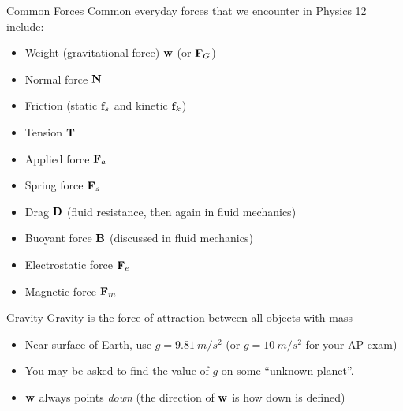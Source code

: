 \documentclass[12pt,compress,aspectratio=169]{beamer}
\newcommand{\mb}[1]{\ensuremath\mathbf{#1}}
\newcommand{\eq}[2]{\vspace{#1}{\Large\begin{displaymath}#2\end{displaymath}}}
\begin{document}
\begin{frame}{Common Forces}
  Common everyday forces that we encounter in Physics 12 include:
  \begin{itemize}
  \item Weight (gravitational force) $\mb{w}$ (or $\mb{F}_G$)
  \item Normal force $\mb{N}$
  \item Friction (static $\mb{f}_s$ and kinetic $\mb{f}_k$)
  \item Tension $\mb{T}$
  \item Applied force $\mb{F}_a$
  \item Spring force $\mb{F}_s$
  \item Drag $\mb{D}$ (fluid resistance, then again in fluid mechanics)
  \item Buoyant force $\mb{B}$ (discussed in fluid mechanics)
  \item Electrostatic force $\mb{F}_e$
  \item Magnetic force $\mb{F}_m$
  \end{itemize}
\end{frame}



\begin{frame}{Gravity}
  Gravity is the force of attraction between all objects with mass
    
  \eq{-.2in}{
    \boxed{\mb{w}=m\mb{g}}
  }
  \begin{itemize}
  \item\vspace{-.15in}Near surface of Earth, use $g=\SI{9.81}{m/s^2}$ (or
    $g=\SI{10}{m/s^2}$ for your AP exam)
  \item You may be asked to find the value of $g$ on some ``unknown planet''.
  \item $\mb{w}$ always points \emph{down} (the direction of $\mb{w}$ is how
    down is defined)
%
  \end{itemize}    
\end{frame}
\end{document}
